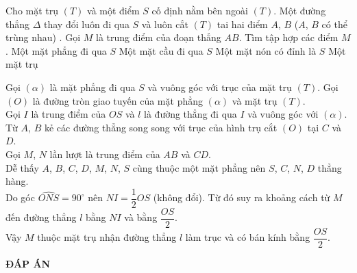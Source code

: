 \begin{ex}%
 Cho mặt trụ $(T)$ và một điểm $S$ cố định nằm bên ngoài $(T)$. Một đường thẳng $\Delta$ thay đổi luôn đi qua $S$ và luôn cắt $(T)$ tai hai điểm $A$, $B$ ($A$, $B$ có thể trùng nhau) . Gọi $M$ là trung điểm của đoạn thẳng $AB$. Tìm tập hợp các điểm $M$.
 \choice
  {Một mặt phẳng đi qua $S$}
  {Một mặt cầu đi qua $S$}
  {Một mặt nón có đỉnh là $S$}
  {\True Một mặt trụ}
 \loigiai
  {
  \begin{center}
  \end{center}
  Gọi $(\alpha)$ là mặt phẳng đi qua $S$ và vuông góc với trục của mặt trụ $(T)$.
  Gọi $(O)$ là đường tròn giao tuyến của mặt phẳng $(\alpha)$ và mặt trụ $(T)$.\\
  Gọi $I$ là trung điểm của $OS$ và $l$ là đường thẳng đi qua $I$ và vuông góc với $(\alpha)$.\\
  Từ $A$, $B$ kẻ các đường thẳng song song với trục của hình trụ cắt $(O)$ tại $C$ và $D$.\\
  Gọi $M$, $N$ lần lượt là trung điểm của $AB$ và $CD$.\\
  Dễ thấy $A$, $B$, $C$, $D$, $M$, $N$, $S$ cùng thuộc một mặt phẳng nên $S$, $C$, $N$, $D$ thẳng hàng.\\
  Do góc $\widehat{ONS} = 90^\circ$ nên $NI = \dfrac{1}{2}OS$ (không đổi). Từ đó suy ra khoảng cách từ $M$ đến đường thẳng $l$ bằng $NI$ và bằng $\dfrac{OS}{2}$.\\
  Vậy $M$ thuộc mặt trụ nhận đường thẳng $l$ làm trục và có bán kính bằng $\dfrac{OS}{2}$.
  }
\end{ex}




\newpage
\begin{center}
	\textbf{ĐÁP ÁN}
\end{center}
\begin{multicols}{10}
	 
\end{multicols}
